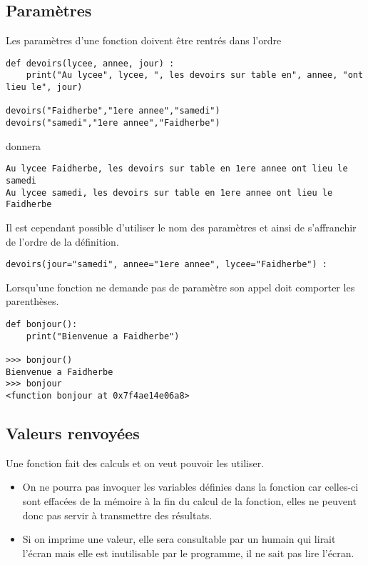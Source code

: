 \subsection{Paramètres}
Les paramètres d'une fonction doivent être rentrés dans l'ordre 

\begin{lstlisting}
def devoirs(lycee, annee, jour) :
    print("Au lycee", lycee, ", les devoirs sur table en", annee, "ont lieu le", jour)

devoirs("Faidherbe","1ere annee","samedi")
devoirs("samedi","1ere annee","Faidherbe")
\end{lstlisting}

donnera

\begin{lstlisting}
Au lycee Faidherbe, les devoirs sur table en 1ere annee ont lieu le samedi
Au lycee samedi, les devoirs sur table en 1ere annee ont lieu le Faidherbe
\end{lstlisting}  


Il est cependant possible d'utiliser le nom des paramètres et ainsi de s'affranchir de l'ordre de la définition.

\begin{lstlisting}
devoirs(jour="samedi", annee="1ere annee", lycee="Faidherbe") :  
\end{lstlisting}

\medskip

Lorsqu'une fonction ne demande pas de paramètre son appel doit comporter les parenthèses.
\begin{lstlisting}
def bonjour():
    print("Bienvenue a Faidherbe")
    
>>> bonjour()
Bienvenue a Faidherbe
>>> bonjour
<function bonjour at 0x7f4ae14e06a8>
\end{lstlisting}
\newpage
\subsection{Valeurs renvoyées}
Une fonction fait des calculs et on veut pouvoir les utiliser.

\begin{itemize}
	\item On ne pourra pas invoquer les variables définies dans la fonction car celles-ci sont effacées de la mémoire à la fin du calcul de la fonction, elles ne peuvent donc pas servir à transmettre des résultats.
	\item Si on imprime une valeur, elle sera consultable par un humain qui lirait l'écran mais elle est inutilisable par le programme, il ne sait pas lire l'écran.
\end{itemize}

